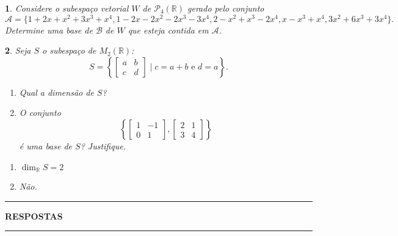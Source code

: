\documentclass[12pt]{exam}
\newtheorem{exercicio}{}
\newcommand{\real}{\mathbb{R}}
\begin{document}
\begin{exercicio}
  Considere o subespa\c{c}o vetorial $W$ de $\mathcal{P}_4(\real)$ gerado pelo conjunto
  \[
    \mathcal{A} = \{1+2x+x^2+3x^3+x^4, 1-2x-2x^2-2x^3-3x^4,2-x^2+x^3-2x^4,x-x^3+x^4,3x^2+6x^3+3x^4\}.
  \]
  Determine uma base de $\mathcal{B}$ de $W$ que esteja contida em $\mathcal{A}$.
\end{exercicio}

\begin{exercicio}
  Seja $S$ o subespa\c{c}o de $M_2(\real)$:
  \[
    S = \left\{\begin{bmatrix}
      a & b\\c & d
    \end{bmatrix} \mid c = a+b \mbox{ e } d = a\right\}.
  \]
  \begin{enumerate}[label={\alph*})]
    \item Qual a dimens\~ao de $S$?
    \item O conjunto
    \[
      \left\{\begin{bmatrix}
        1 & -1\\0 & 1
      \end{bmatrix}, \begin{bmatrix}
        2 & 1\\3 & 4
      \end{bmatrix}\right\}
    \]
    \'e uma base de $S$? Justifique.
  \end{enumerate}
  \begin{solucao}
    \begin{enumerate}[label={\alph*})]
      \item $\dim_\real S = 2$
      \item N\~ao.
    \end{enumerate}
  \end{solucao}
\end{exercicio}

\newpage
{}
\hrule
\begin{center}
{\large\bf RESPOSTAS}
\end{center}
\hrule

\end{document}
